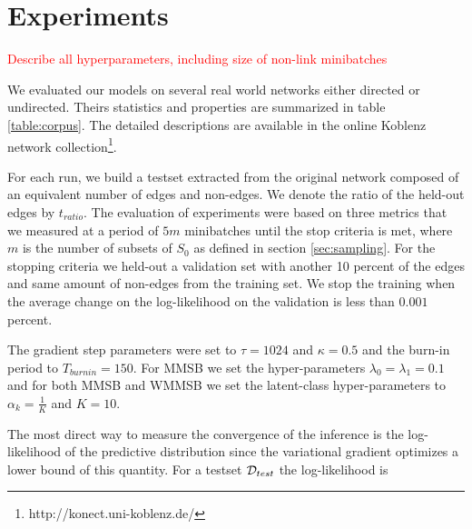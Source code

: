 \section{Experiments}
\label{sec:exps}

%
%

\textcolor{red}{Describe all hyperparameters, including size of non-link minibatches}


We evaluated our models on several real world networks either directed or undirected. Theirs statistics and properties are summarized in table \ref{table:corpus}. The detailed descriptions are available in the online Koblenz network collection\footnote{http://konect.uni-koblenz.de/}.

\begin{table}[h]
\bgroup
\def\arraystretch{1} %
	
\egroup
\label{table:corpus}
\end{table}


%
%

For each run, we build a testset extracted from the original network composed of an equivalent number of edges and non-edges. We denote the ratio of the held-out edges by $t_{ratio}$. The evaluation of experiments were based on three metrics that we measured at a period of $5m$ minibatches until the stop criteria is met, where $m$ is the number of subsets of $S_0$ as defined in section \ref{sec:sampling}. For the stopping criteria we held-out a validation set with another 10 percent of the edges and same amount of non-edges from the training set. We stop the training when the average change on the log-likelihood on the validation is less than $0.001$ percent.

The gradient step parameters were set to $\tau=1024$ and $\kappa=0.5$ and the burn-in period  to $T_{burnin}=150$. For MMSB we set the hyper-parameters $\lambda_0=\lambda_1=0.1$ and for both MMSB and WMMSB we set the latent-class hyper-parameters to $\alpha_k=\frac{1}{K}$ and $K=10$.


%
%

The most direct way to measure the convergence of the inference is the log-likelihood of the predictive distribution since the variational gradient optimizes a lower bound of this quantity. For a testset $\mathcal{D}_{test}$ the log-likelihood is

\begin{figure}[h]
\centering
	
    \label{fig:conv_entropy}
\end{figure}

